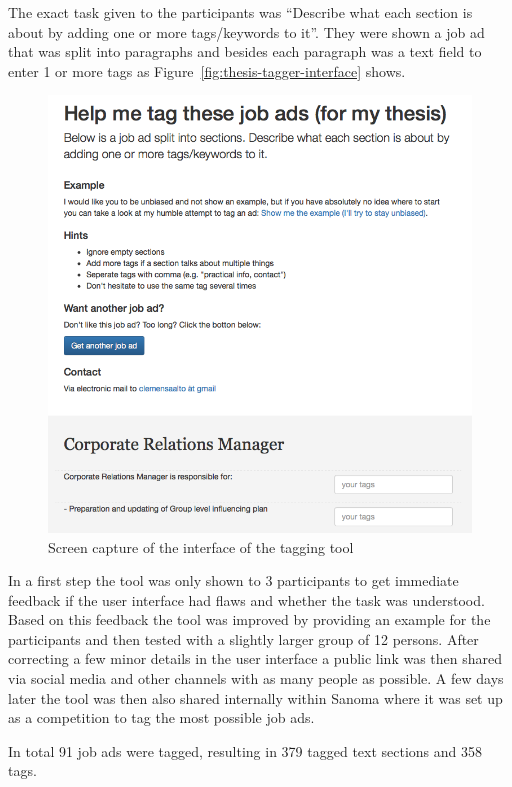 The exact task given to the participants was ``Describe what each section is about by adding one or more tags/keywords to it''. They were shown a job ad that was split into paragraphs and besides each paragraph was a text field to enter 1 or more tags as Figure~\ref{fig:thesis-tagger-interface} shows.

\begin{figure}[h]
  \centering
  \includegraphics[width=\textwidth]{img/thesis-tagger-interface.png}
  \caption{Screen capture of the interface of the tagging tool}
\label{fig:thesis-tagger interface}
\end{figure}

In a first step the tool was only shown to 3 participants to get immediate feedback if the user interface had flaws and whether the task was understood. Based on this feedback the tool was improved by providing an example for the participants and then tested with a slightly larger group of 12 persons. After correcting a few minor details in the user interface a public link was then shared via social media and other channels with as many people as possible. A few days later the tool was then also shared internally within Sanoma where it was set up as a competition to tag the most possible job ads.

In total 91 job ads were tagged, resulting in 379 tagged text sections and 358 tags.


